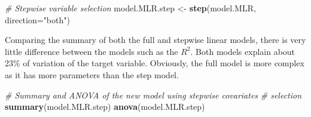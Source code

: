 \documentclass[10pt,b5paper,]{book}
\newenvironment{Shaded}{\begin{snugshade}}{\end{snugshade}}
\newcommand{\CommentTok}[1]{\textcolor[rgb]{0.56,0.35,0.01}{\textit{#1}}}
\newcommand{\DataTypeTok}[1]{\textcolor[rgb]{0.13,0.29,0.53}{#1}}
\newcommand{\KeywordTok}[1]{\textcolor[rgb]{0.13,0.29,0.53}{\textbf{#1}}}
\newcommand{\NormalTok}[1]{#1}
\newcommand{\StringTok}[1]{\textcolor[rgb]{0.31,0.60,0.02}{#1}}
\theoremstyle{definition}
\theoremstyle{definition}
\theoremstyle{definition}
\theoremstyle{remark}
\begin{document}
\begin{Shaded}
\begin{Highlighting}[]
\CommentTok{# Stepwise variable selection}
\NormalTok{model.MLR.step <-}\StringTok{ }\KeywordTok{step}\NormalTok{(model.MLR, }\DataTypeTok{direction=}\StringTok{"both"}\NormalTok{)}
\end{Highlighting}
\end{Shaded}

Comparing the summary of both the full and stepwise linear models, there
is very little difference between the models such as the \(R^2\). Both
models explain about 23\% of variation of the target variable.
Obviously, the full model is more complex as it has more parameters than
the step model.

\begin{Shaded}
\begin{Highlighting}[]
\CommentTok{# Summary and ANOVA of the new model using stepwise covariates}
\CommentTok{# selection}
\KeywordTok{summary}\NormalTok{(model.MLR.step)}
\KeywordTok{anova}\NormalTok{(model.MLR.step)}
\end{Highlighting}
\end{Shaded}
\end{document}
